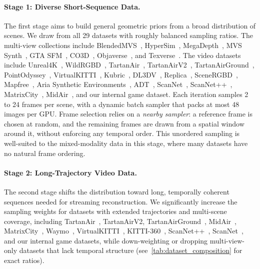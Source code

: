 \paragraph{Stage 1: Diverse Short-Sequence Data.}
The first stage aims to build general geometric priors from a broad
distribution of scenes.
We draw from all 29 datasets with roughly balanced sampling ratios.
The multi-view collections include
BlendedMVS~\cite{yao2020blendedmvs},
HyperSim~\cite{roberts2021hypersim},
MegaDepth~\cite{li2018megadepth},
MVS Synth~\cite{huang2018deepmvs},
GTA SFM~\cite{wang2020flow},
CO3D~\cite{reizenstein2021common},
Objaverse~\cite{deitke2023objaverse},
and Texverse~\cite{zhang2025texverse}.
The video datasets include
Unreal4K~\cite{tosi2021smd},
WildRGBD~\cite{xia2024rgbd},
TartanAir~\cite{wang2020tartanair},
TartanAirV2~\cite{wang2020tartanair},
TartanAirGround~\cite{patel2025tartanground},
PointOdyssey~\cite{zheng2023pointodyssey},
VirtualKITTI~\cite{cabon2020virtual},
Kubric~\cite{greff2022kubric},
DL3DV~\cite{ling2024dl3dv},
Replica~\cite{straub2019replica},
SceneRGBD~\cite{McCormac:etal:ICCV2017},
Mapfree~\cite{arnold2022map},
Aria Synthetic Environments~\cite{pan2023aria},
ADT~\cite{pan2023aria},
ScanNet~\cite{dai2017scannet},
ScanNet++~\cite{yeshwanth2023scannet++},
MatrixCity~\cite{li2023matrixcity},
MidAir~\cite{Fonder2019MidAir},
and our internal game dataset.
Each iteration samples 2 to 24 frames per scene, with a dynamic batch
sampler that packs at most 48 images per GPU.
Frame selection relies on a \emph{nearby sampler}: a reference frame is
chosen at random, and the remaining frames are drawn from a spatial
window around it, without enforcing any temporal order.
This unordered sampling is well-suited to the mixed-modality data in
this stage, where many datasets have no natural frame ordering.

\paragraph{Stage 2: Long-Trajectory Video Data.}
The second stage shifts the distribution toward long, temporally coherent
sequences needed for streaming reconstruction.
We significantly increase the sampling weights for datasets with
extended trajectories and multi-scene coverage, including
TartanAir~\cite{wang2020tartanair},
TartanAirV2,
TartanAirGround~\cite{patel2025tartanground},
MidAir~\cite{Fonder2019MidAir},
MatrixCity~\cite{li2023matrixcity},
Waymo~\cite{sun2020scalability},
VirtualKITTI~\cite{cabon2020virtual},
KITTI-360~\cite{liao2022kitti},
ScanNet++~\cite{yeshwanth2023scannet++},
ScanNet~\cite{dai2017scannet},
and our internal game datasets,
while down-weighting or dropping multi-view-only datasets that lack
temporal structure
(see~\cref{tab:dataset_composition} for exact ratios).

